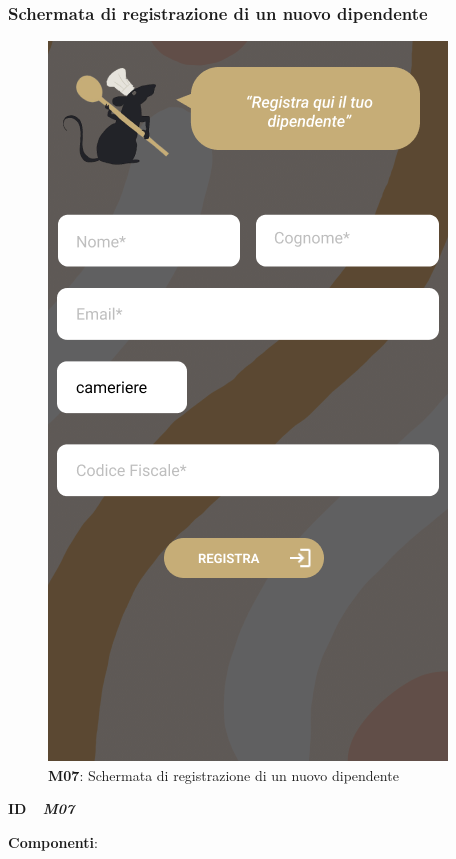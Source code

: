         \subsubsection{Schermata di registrazione di un nuovo dipendente}
        \begin{figure}[H]
            \centering
            \includegraphics[scale=0.35]{assets/diagrammi/Mockup/Mockup_SaveWorker.png}
            \caption{\textbf{M07}: Schermata di registrazione di un nuovo dipendente}\label{fig:Mockup_SaveWaiter}
        \end{figure}
        \begin{flushleft}
            \textbf{ID} \ \Large{ \emph{\textbf{M07}}}
        \end{flushleft}
        \textbf{Componenti}:

